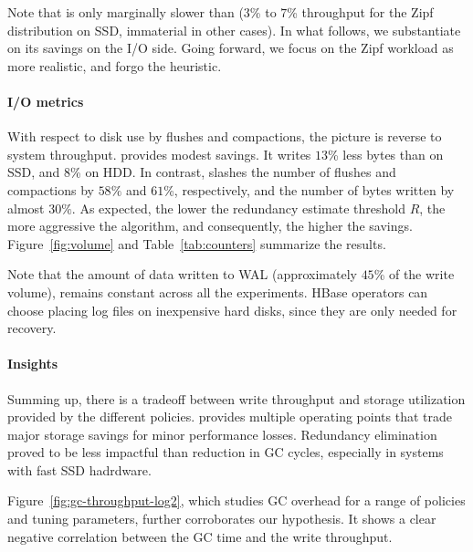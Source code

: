 Note that \adp\/ is only marginally slower than \basic\/ ($3$\% to $7$\% throughput for the Zipf 
distribution on SSD, immaterial in other cases).  In what follows, we substantiate on its savings 
on the I/O side. Going forward, we focus on the Zipf workload as more realistic, and 
forgo the \eager\/ heuristic. 

\paragraph{I/O metrics}
With respect to disk use by flushes and compactions, the picture is reverse to system throughput. 
\basic\/ provides modest savings. It writes $13$\% less bytes than \none\/ on SSD, and $8$\% 
on HDD. In contrast, \adp slashes the number of flushes and compactions by $58\%$ and $61$\%, 
respectively, and the number of bytes written by almost $30\%$. As expected, the lower the 
redundancy estimate threshold $R$, the more aggressive the algorithm, and consequently, 
the higher the savings. Figure~\ref{fig:volume} and Table~\ref{tab:counters} summarize the results. 

Note that the amount of data written to WAL %
(approximately $45$\% of the write volume), remains constant across all the experiments. 
HBase operators can choose placing log files on inexpensive hard disks, since they are only needed for recovery.  

\paragraph{Insights} Summing up, there is a tradeoff between write throughput and storage utilization 
provided by the different \sys\/ policies. \adp\/ provides multiple operating points that trade major 
storage savings for minor performance losses. Redundancy elimination proved to be less impactful 
than reduction in GC cycles, especially in systems with fast SSD hadrdware. 

Figure~\ref{fig:gc-throughput-log2}, which studies GC overhead for a range of policies and tuning 
parameters, further corroborates our hypothesis. It shows a clear negative correlation between the GC time 
and the write throughput. 

